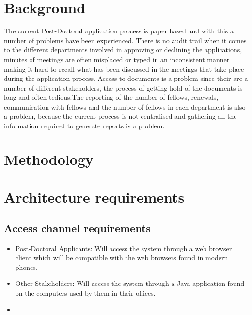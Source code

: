 \documentclass[12pt]{article}
\begin{document}
	\newpage
	\section{Background} %
	\vspace{0.2in}
	The current Post-Doctoral application process is paper based and with this a number of problems have been experienced. There is no audit trail when it comes to the different departments involved in approving or declining the applications, minutes of meetings are often misplaced or typed in an inconsistent manner making it hard to recall what has been discussed in the meetings that take place during the application process. Access to documents is a problem since their are a number of different stakeholders, the process of getting hold of the documents is long and often tedious.The reporting of the number of fellows, renewals, communication with fellows and the number of fellows in each department is also a problem, because the current process is not centralised and gathering all the information required to generate reports is a problem.
	\vspace{0.5in}
	
	\newpage
	\section{Methodology} %
	\vspace{0.2in}
	
	\vspace{0.5in}
	
	\newpage
	\section{Architecture requirements}
		\subsection{Access channel requirements} %
		\vspace{0.2in}
		\begin{itemize}
		\item Post-Doctoral Applicants: Will access the system through a web browser client which will be compatible with the web browsers found in modern phones. 
		\item Other Stakeholders: Will access the system through a Java application found on the computers used by them in their offices.
		\item %
		\end{itemize}
\end{document}
